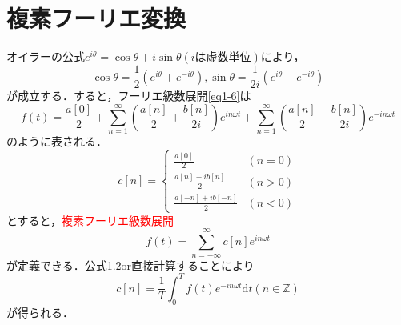 \documentclass[a4j]{jsbook}
\numberwithin{theorem}{chapter}  %
\begin{document}
\section{複素フーリエ変換} \label{sec1-3}
オイラーの公式\(e^{i\theta}=\cos\theta+i\sin\theta(i\mbox{は虚数単位})\)により，
\begin{equation*}
    \cos\theta=\frac{1}{2}\left(e^{i\theta}+e^{-i\theta}\right), \sin\theta=\frac{1}{2i}\left(e^{i\theta}-e^{-i\theta}\right)
\end{equation*}
が成立する．すると，フーリエ級数展開\eqref{eq1-6}は
\begin{equation*}
    f(t)=\frac{a[0]}{2}+\sum_{n=1}^\infty\left(\frac{a[n]}{2}+\frac{b[n]}{2i}\right)e^{in\omega t}+\sum_{n=1}^\infty\left(\frac{a[n]}{2}-\frac{b[n]}{2i}\right)e^{-in\omega t}
\end{equation*}
のように表される．
\begin{equation*}
    c[n]=\begin{cases}
    \frac{a[0]}{2} & (n=0) \\
    \frac{a[n]-ib[n]}{2} & (n>0) \\
    \frac{a[-n]+ib[-n]}{2} & (n<0)
    \end{cases}
\end{equation*}
とすると，\textcolor{red}{複素フーリエ級数展開}
\begin{equation}
    f(t)=\sum_{n=-\infty}^\infty c[n]e^{in\omega t}
\end{equation}
が定義できる．公式1.2or直接計算することにより
\begin{equation*}
    c[n]=\frac{1}{T}\int_0^T f(t)e^{-in\omega t}\mathrm{d}t (n\in\mathbb{Z})
\end{equation*}
が得られる．
\end{document}
